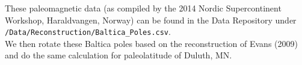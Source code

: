 \documentclass{article}
\begin{document}
\noindent These paleomagnetic data (as compiled by the 2014 Nordic Supercontinent Workshop, Haraldvangen, Norway) can be found in the Data Repository under \texttt{/Data/Reconstruction/Baltica\_Poles.csv}.\\        
                                                    
    We then rotate these Baltica poles based on the reconstruction of Evans
(2009) and do the same calculation for paleolatitude of Duluth, MN.
\end{document}
